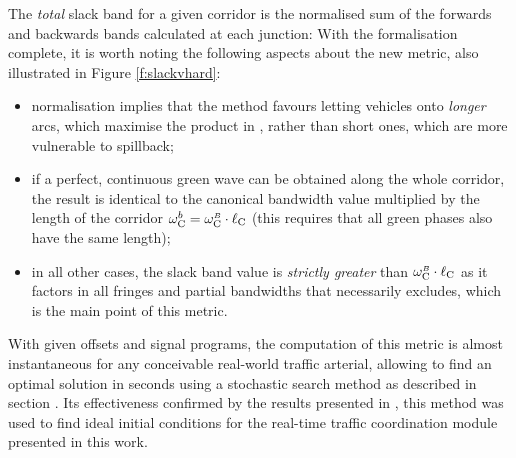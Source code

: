 The \emph{total} slack band for a given corridor is the normalised sum of the forwards and backwards bands calculated at each junction:
With the formalisation complete, it is worth noting the following aspects about the new metric, also illustrated in Figure \ref{f:slackvhard}:
\begin{itemize}
\item normalisation implies that the method favours letting vehicles onto \emph{longer} arcs, which maximise the product in , rather than short ones, which are more vulnerable to spillback;
\item if a perfect, continuous green wave can be obtained along the whole corridor, the result is identical to the canonical bandwidth value multiplied by the length of the corridor 
$\omega_{\mathrm{C}}^{\scriptstyle{b}} = \omega_{\mathrm{C}}^{\scriptscriptstyle{B}} \cdot \ell_{\mathrm{C}}$ (this requires that all green phases also have the same length);
\item in all other cases, the slack band value is \emph{strictly greater} than 
$\omega_{\mathrm{C}}^{\scriptscriptstyle{B}} \cdot \ell_{\mathrm{C}}$ as it factors in all fringes and partial bandwidths that  necessarily excludes, which is the main point of this metric.
\end{itemize}


With given offsets and signal programs, the computation of this metric is almost instantaneous for any conceivable real-world traffic arterial, allowing to find an optimal solution in seconds using a stochastic search method as described in section . Its effectiveness confirmed by the results presented in , this method was used to find ideal initial conditions for the real-time traffic coordination module presented in this work.